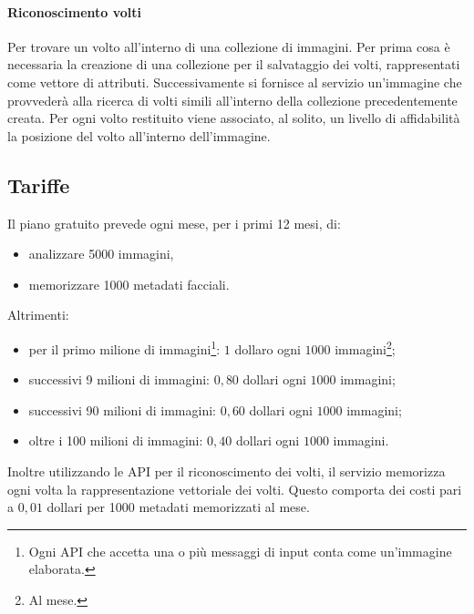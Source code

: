 \paragraph{Riconoscimento volti} Per trovare un volto all'interno di una collezione di immagini. Per prima cosa è necessaria la creazione di una collezione per il salvataggio dei volti, rappresentati come vettore di attributi.
Successivamente si fornisce al servizio un'immagine che provvederà alla ricerca di volti simili all'interno della collezione precedentemente creata.
Per ogni volto restituito viene associato, al solito, un livello di affidabilità la posizione del volto all'interno dell'immagine.


\subsection{Tariffe}
Il piano gratuito prevede ogni mese, per i primi 12 mesi, di:
\begin{itemize}
\item analizzare 5000 immagini,
\item memorizzare 1000 metadati facciali.
\end{itemize}
Altrimenti:
\begin{itemize}
\item per il primo milione di immagini\footnote{Ogni API che accetta una o più messaggi di input conta come un'immagine elaborata.}: $1$ dollaro ogni $1000$ immagini\footnote{Al mese.};
\item successivi 9 milioni di immagini: $0,80$ dollari ogni $1000$ immagini;
\item successivi 90 milioni di immagini: $0,60$ dollari ogni $1000$ immagini;
\item oltre i 100 milioni di immagini: $0,40$ dollari ogni $1000$ immagini.
\end{itemize}
Inoltre utilizzando le API per il riconoscimento dei volti, il servizio memorizza ogni volta la rappresentazione vettoriale dei volti. Questo comporta dei costi pari a $0,01$ dollari per 1000 metadati memorizzati al mese.
